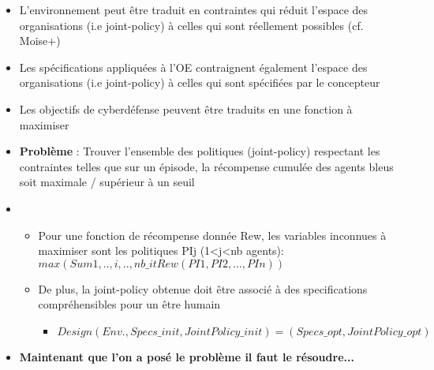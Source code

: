 \begin{itemize}

    \item L'environnement peut être traduit en contraintes qui réduit l'espace des organisations (i.e joint-policy) à celles qui sont réellement possibles (cf. Moise+)
    \item Les spécifications appliquées à l'OE contraignent également l'espace des organisations (i.e joint-policy) à celles qui sont spécifiées par le concepteur
    \item Les objectifs de cyberdéfense peuvent être traduits en une fonction à maximiser
    \item \textbf{Problème} : Trouver l’ensemble des politiques (joint-policy) respectant les contraintes telles que sur un épisode, la récompense cumulée des agents bleus soit maximale / supérieur à un seuil
    \item \begin{itemize}
              \item Pour une fonction de récompense donnée Rew, les variables inconnues à maximiser sont les politiques PIj (1<j<nb agents):
                    $max (Sum{1, .., i, .., nb\_it} Rew(PI1, PI2, …, PIn))$
              \item De plus, la joint-policy obtenue doit être associé à des specifications compréhensibles pour un être humain
                    \begin{itemize}
                        \item $Design(Env., Specs\_init, JointPolicy\_init) = (Specs\_opt, JointPolicy\_opt)$
                    \end{itemize}
          \end{itemize}
    \item \textbf{Maintenant que l'on a posé le problème il faut le résoudre...}
\end{itemize}
